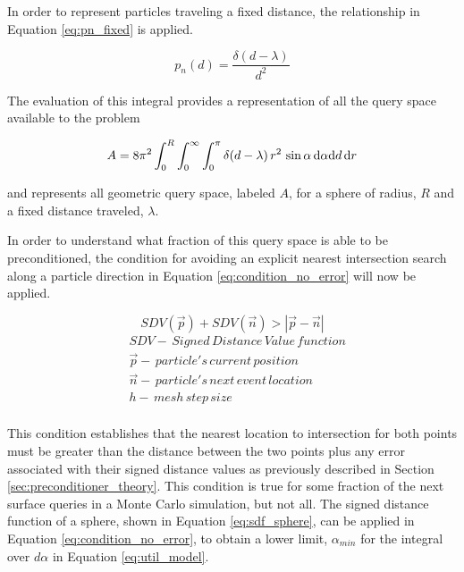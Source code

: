 In order to represent particles traveling a fixed distance, the relationship in
Equation \eqref{eq:pn_fixed} is applied.

\begin{equation}
  \label{eq:pn_fixed}
  p_n(d) = \frac{\delta(d-\lambda)}{d^{2}}
\end{equation}

The evaluation of this integral provides a representation of all the query
space available to the problem

\begin{equation}
  \label{eq:A_fixed}
\small A = 8\pi^2  \int_{0}^{R}\int_{0}^{\infty}\int_{0}^{\pi} \delta(d-\lambda) \,
r^2 \, \sin{\alpha} \, \mathrm{d}\alpha \mathrm{d}d \, \mathrm{d}r
\end{equation}

and represents all geometric query space, labeled $A$, for a sphere of radius,
$R$ and a fixed distance traveled, $\lambda$.

In order to understand what fraction of this query space is able to be
preconditioned, the condition for avoiding an explicit nearest intersection
search along a particle direction in Equation \eqref{eq:condition_no_error} will now be
applied.

\begin{equation}
  SDV(\vec{p}) + SDV(\vec{n}) > |\vec{p}-\vec{n}|
  \label{eq:condition_no_error}
\end{equation}
\begin{align*}
 &SDV - \, Signed \, Distance \, Value \, function \\
 &\vec{p} - \, particle's \, current \, position \\
 &\vec{n} - \, particle's \, next \, event \, location \\
 &h - \, mesh \, step \, size \\
\end{align*}

This condition establishes that the nearest location to intersection for both
points must be greater than the distance between the two points plus any error
associated with their signed distance values as previously described in Section
\ref{sec:preconditioner_theory}. This condition is true for some fraction of
the next surface queries in a Monte Carlo simulation, but not all. The signed
distance function of a sphere, shown in Equation \eqref{eq:sdf_sphere}, can be
applied in Equation \eqref{eq:condition_no_error}, to obtain a lower limit,
$\alpha_{min}$ for the integral over $d\alpha$ in Equation \eqref{eq:util_model}.

